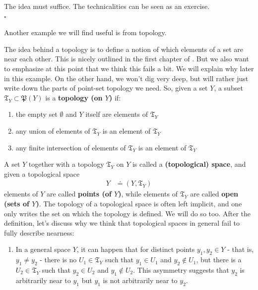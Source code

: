 \begin{prf}
The idea must suffice.
The technicalities can be seen as an exercise.
\\
\phantom{proven}
\hfill
$\square$
\end{prf}
Another example we will find useful is from topology.
\\
\begin{exa}
\label{exa:topology}
The idea behind a topology is to define a notion of which elements of a set are near each other.
This is nicely outlined in the first chapter of \cite{797789bc}.
But we also want to emphasize at this point that we think this fails a bit.
We will explain why later in this example.
On the other hand, we won't dig very deep, but will rather just write down the parts of point-set topology we need.
So, given a set $Y$, a subset $\mathfrak{T}_{Y} \subset \mathfrak{P}(Y)$ is a \textbf{topology (on $Y$)} if:
\begin{enumerate}
\item[(T1)]
the empty set $\emptyset$ and $Y$ itself are elements of $\mathfrak{T}_{Y}$
\item[(T2)]
any union of elements of $\mathfrak{T}_{Y}$ is an element of $\mathfrak{T}_{Y}$
\item[(T3)]
any finite intersection of elements of $\mathfrak{T}_{Y}$ is an element of $\mathfrak{T}_{Y}$
\end{enumerate}
A set $Y$ together with a topology $\mathfrak{T}_{Y}$ on $Y$ is called a \textbf{(topological) space}, and given a topological space
\begin{align*}
  Y
  &\doteq
  (Y,\mathfrak{T}_{Y})
\end{align*}
elements of $Y$ are called \textbf{points (of $Y$)}, while elements of $\mathfrak{T}_{Y}$ are called \textbf{open (sets of $Y$)}.
The topology of a topological space is often left implicit, and one only writes the set on which the topology is defined.
We will do so too.
After the definition, let's discuss why we think that topological spaces in general fail to fully describe nearness:
\begin{enumerate}
\item[$\bullet$]
In a general space $Y$, it can happen that for distinct points $y_{1},y_{2} \in Y$ - that is, $y_{1} \neq y_{2}$ - there is no $U_{1} \in \mathfrak{T}_{Y}$ such that $y_{1} \in U_{1}$ and $y_{2} \notin U_{1}$, but there is a $U_{2} \in \mathfrak{T}_{Y}$ such that $y_{2} \in U_{2}$ and $y_{1} \notin U_{2}$.
This asymmetry suggests that $y_{2}$ is arbitrarily near to $y_{1}$ but $y_{1}$ is not arbitrarily near to $y_{2}$.

\end{enumerate}
\end{exa}
